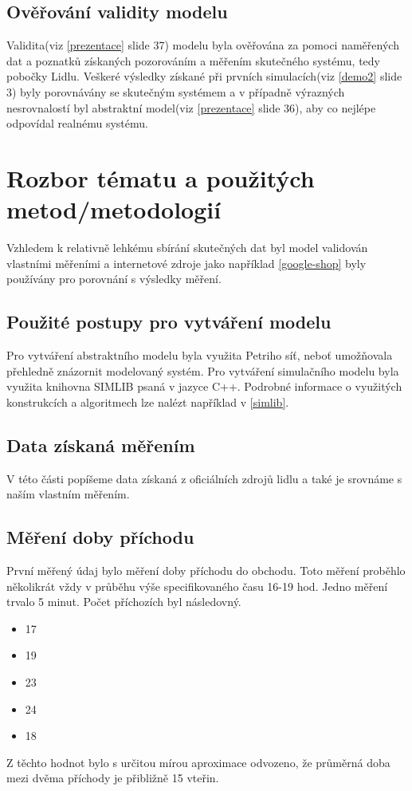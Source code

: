 \documentclass[12pt,a4paper,titlepage]{article}
\begin{document}
\subsection{Ověřování validity modelu}
Validita(viz \ref{prezentace} slide 37) modelu byla ověřována za pomoci naměřených dat a poznatků získaných pozorováním a měřením skutečného systému, tedy pobočky Lidlu. Veškeré výsledky získané při prvních simulacích(viz \ref{demo2} slide 3) byly porovnávány se skutečným systémem a v případně výrazných nesrovnalostí byl abstraktní model(viz \ref{prezentace} slide 36), aby co nejlépe odpovídal realnému systému.
\section{Rozbor tématu a použitých metod/metodologií}
Vzhledem k relativně lehkému sbírání skutečných dat byl model validován vlastními měřeními a internetové zdroje jako například \ref{google-shop} byly používány pro porovnání s výsledky měření. 

\subsection{Použité postupy pro vytváření modelu}
Pro vytváření abstraktního modelu byla využita Petriho síť, neboť umožňovala přehledně znázornit modelovaný systém. Pro vytváření simulačního modelu byla využita knihovna SIMLIB psaná v jazyce C++. Podrobné informace o využitých konstrukcích a algoritmech lze nalézt například v \ref{simlib}.

\subsection{Data získaná měřením}
V této části popíšeme data získaná z oficiálních zdrojů lidlu a také je srovnáme s naším vlastním měřením.
\subsection{Měření doby příchodu}
První měřený údaj bylo měření doby příchodu do obchodu. Toto měření proběhlo několikrát vždy v průběhu výše specifikovaného času 16-19 hod. Jedno měření trvalo 5 minut. Počet příchozích byl následovný. 
\begin{itemize}
\item 17
\item 19
\item 23
\item 24
\item 18
\end{itemize}
Z těchto hodnot bylo s určitou mírou aproximace odvozeno, že průměrná doba mezi dvěma příchody je přibližně 15 vteřin.
\end{document}
